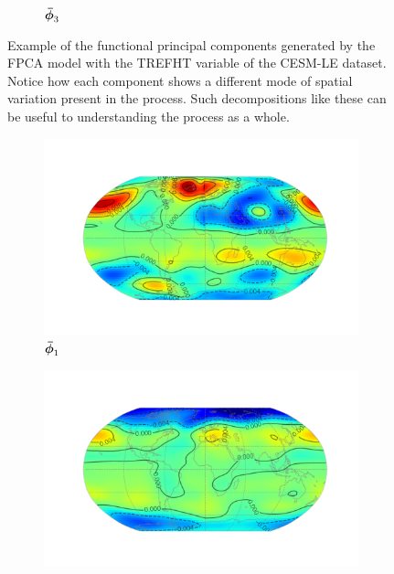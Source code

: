 \begin{figure}
\begin{subfigure}[b]{0.45\textwidth}
		\caption{$\bm{{\bar{\phi}}}_{3}$}
		\label{fig:ftsm_res_TREFHT_fpc_3}
	\end{subfigure}
	\caption[Example of the functional principal components generated by the FPCA model with the TREFHT variable of the CESM-LE dataset.]{Example of the functional principal components generated by the FPCA model with the TREFHT variable of the CESM-LE dataset. Notice how each component shows a different mode of spatial variation present in the process. Such decompositions like these can be useful to understanding the process as a whole.}
	\label{fig:ftsm_res_TREFHT_fpc}
\end{figure}

\begin{figure}
	\centering
	\begin{subfigure}[b]{0.45\textwidth}
		\includegraphics[width=\textwidth]{ftsm_res_PS_fpc_0}
		\caption{$\bm{{\bar{\phi}}}_{1}$}
		\label{fig:ftsm_res_PS_fpc_1}
	\end{subfigure}
	\vfill       
	\begin{subfigure}[b]{0.45\textwidth}
		\includegraphics[width=\textwidth]{ftsm_res_PS_fpc_1}

\end{subfigure}
\end{figure}
